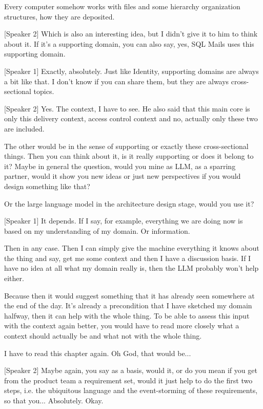 Every computer somehow works with files and some hierarchy organization structures, how they are deposited.

[Speaker 2]
Which is also an interesting idea, but I didn't give it to him to think about it. If it's a supporting domain, you can also say, yes, SQL Mails uses this supporting domain.

[Speaker 1]
Exactly, absolutely. Just like Identity, supporting domains are always a bit like that. I don't know if you can share them, but they are always cross-sectional topics.

[Speaker 2]
Yes. The context, I have to see. He also said that this main core is only this delivery context, access control context and no, actually only these two are included.

The other would be in the sense of supporting or exactly these cross-sectional things. Then you can think about it, is it really supporting or does it belong to it? Maybe in general the question, would you mine as LLM, as a sparring partner, would it show you new ideas or just new perspectives if you would design something like that?

Or the large language model in the architecture design stage, would you use it?

[Speaker 1]
It depends. If I say, for example, everything we are doing now is based on my understanding of my domain. Or information.

Then in any case. Then I can simply give the machine everything it knows about the thing and say, get me some context and then I have a discussion basis. If I have no idea at all what my domain really is, then the LLM probably won't help either.

Because then it would suggest something that it has already seen somewhere at the end of the day. It's already a precondition that I have sketched my domain halfway, then it can help with the whole thing. To be able to assess this input with the context again better, you would have to read more closely what a context should actually be and what not with the whole thing.

I have to read this chapter again. Oh God, that would be...

[Speaker 2]
Maybe again, you say as a basis, would it, or do you mean if you get from the product team a requirement set, would it just help to do the first two steps, i.e. the ubiquitous language and the event-storming of these requirements, so that you... Absolutely. Okay.


